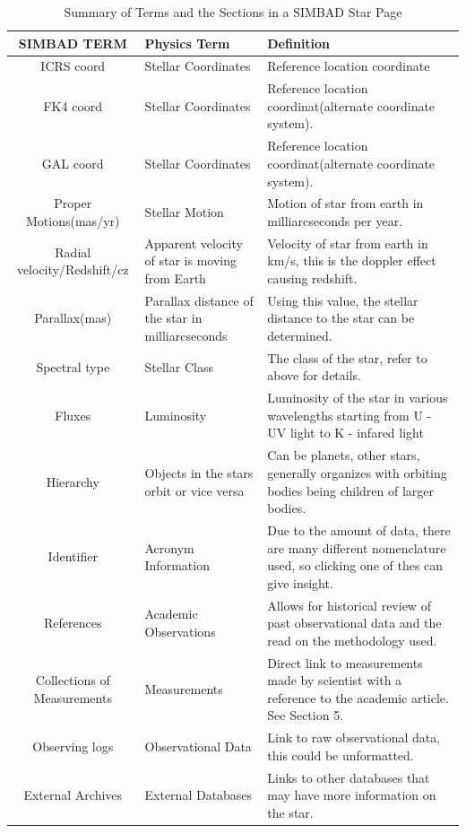 \documentclass[12pt,oneside,a4paper,english]{article}
\begin{document}
\begin{table}[H]
    \centering
    \caption{Summary of Terms and the Sections in a SIMBAD Star Page}
    \begin{tabular}{|c|p{3cm}|p{9cm}|}
    \centering
    \textbf{SIMBAD TERM} & \textbf{Physics Term} & \textbf{Definition} \\ \hline \hline
            ICRS coord  & Stellar Coordinates    & Reference location coordinate     \\ \hline   
            FK4 coord   & Stellar Coordinates    & Reference location coordinat(alternate coordinate system).  \\ \hline
            GAL coord   & Stellar Coordinates    & Reference location coordinat(alternate coordinate system).   \\ \hline
            Proper Motions(mas/yr) & Stellar Motion & Motion of star from earth in milliarcseconds per year.  \\ \hline 
            Radial velocity/Redshift/cz & Apparent velocity of star is moving from Earth & Velocity of star from earth in km/s, this is the doppler effect causing redshift.  \\ \hline
            Parallax(mas) & Parallax distance of the star in milliarcseconds & Using this value, the stellar distance to the star can be determined.  \\ \hline
            Spectral type & Stellar Class & The class of the star, refer to above for details. \\ \hline
            Fluxes & Luminosity & Luminosity of the star in various wavelengths starting from U - UV light to K - infared light \\ \hline
            Hierarchy & Objects in the stars orbit or vice versa & Can be planets, other stars, generally organizes with orbiting bodies being children of larger bodies. \\ \hline
            Identifier & Acronym Information & Due to the amount of data, there are many different nomenclature used, so clicking one of thes can give insight.  \\ \hline
            References & Academic Observations & Allows for historical review of past observational data and the read on the methodology used. \\ \hline
            Collections of Measurements & Measurements  & Direct link to measurements made by scientist with a reference to the academic article. See Section 5.  \\ \hline
            Observing logs & Observational Data & Link to raw observational data, this could be unformatted.  \\ \hline
            External Archives & External Databases & Links to other databases that may have more information on the star.  \\ \hline
    \end{tabular}
    \label{tab:table1}
\end{table}
\newpage
\end{document}
